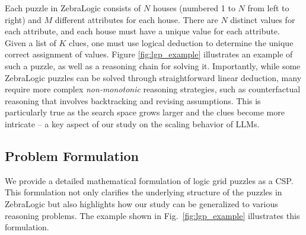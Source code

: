 Each puzzle in ZebraLogic consists of $N$ houses (numbered 1 to $N$ from left to right) and $M$ different attributes for each house. There are $N$ distinct values for each attribute, and each house must have a unique value for each attribute. Given a list of $K$ clues, one must use logical deduction to determine the unique correct assignment of values. Figure \ref{fig:lgp_example} illustrates an example of such a puzzle, as well as a reasoning chain for solving it. 
Importantly, while some ZebraLogic puzzles can be solved through straightforward linear deduction, many require more complex \textit{non-monotonic} reasoning strategies, such as counterfactual reasoning that involves backtracking and revising assumptions. This is particularly true as the search space grows larger and the clues become more intricate -- a key aspect of our study on the scaling behavior of LLMs.
 




\subsection{Problem Formulation}
 
We provide a detailed mathematical formulation of logic grid puzzles as a CSP.
This formulation not only clarifies the underlying structure of the puzzles in ZebraLogic but also highlights how our study can be generalized to various reasoning problems.
The example shown in Fig.~\ref{fig:lgp_example} illustrates this formulation.


